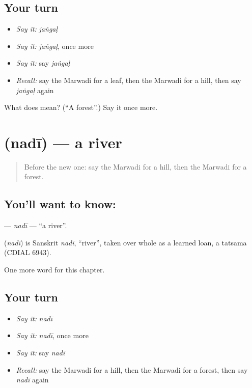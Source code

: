 \subsection*{Your turn}
\begin{itemize}
\raggedright
  \item \emph{Say it:} \emph{jaṅgaḷ}
  \item \emph{Say it:} \emph{jaṅgaḷ}, once more
  \item \emph{Say it:} say \emph{jaṅgaḷ}
  \item \emph{Recall:} say the Marwadi for a leaf, then the Marwadi for a hill, then say \emph{jaṅgaḷ} again
\end{itemize}

\begin{tcolorbox}[breakable,colback=teal!4,colframe=teal!35!black,title={Before you move on}]
What does  mean? (\textquotedblleft{}A forest\textquotedblright{}.) Say it once more.
\end{tcolorbox}
\section[\texorpdfstring{\mw{नदी} (nadī)}{नदी (nadī)}]{ (nadī) — a river}

\label{lesson:MW-C68-nadi}



\begin{quote}
Before the new one: say the Marwadi for a hill, then the Marwadi for a forest.
\end{quote}

\subsection*{You'll want to know: }
\textbf{} — \emph{nadī} — \textquotedblleft{}a river\textquotedblright{}.

\begin{cousinweb}
\textbf{} (\emph{nadī}) is Sanskrit \emph{nadī}, \textquotedblleft{}river\textquotedblright{}, taken over whole as a learned loan, a tatsama (CDIAL 6943).
\end{cousinweb}

\begin{grammarlens}[title={What you've built}]
One more word for this chapter.
\end{grammarlens}

\subsection*{Your turn}
\begin{itemize}
\raggedright
  \item \emph{Say it:} \emph{nadī}
  \item \emph{Say it:} \emph{nadī}, once more
  \item \emph{Say it:} say \emph{nadī}
  \item \emph{Recall:} say the Marwadi for a hill, then the Marwadi for a forest, then say \emph{nadī} again
\end{itemize}

